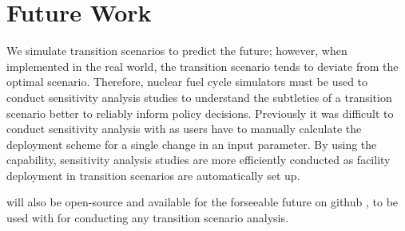 \section{Future Work}
We simulate transition scenarios to predict the future; 
however, when implemented in the real world, the transition 
scenario tends to deviate from the optimal scenario.
Therefore, nuclear fuel cycle simulators must be used to conduct
sensitivity analysis studies to understand the subtleties of 
a transition scenario better to reliably inform policy decisions.
Previously it was difficult to conduct sensitivity analysis with \Cyclus 
as users have to manually calculate the deployment scheme for a 
single change in an input parameter. 
By using the \deploy capability,
sensitivity analysis studies are more efficiently 
conducted as facility deployment in transition scenarios 
are automatically set up. 

\deploy will also be open-source and available for the forseeable future on github 
\cite{chee_arfc/d3ploy:_2019}, to be used with \Cyclus for conducting any 
transition scenario analysis. 
